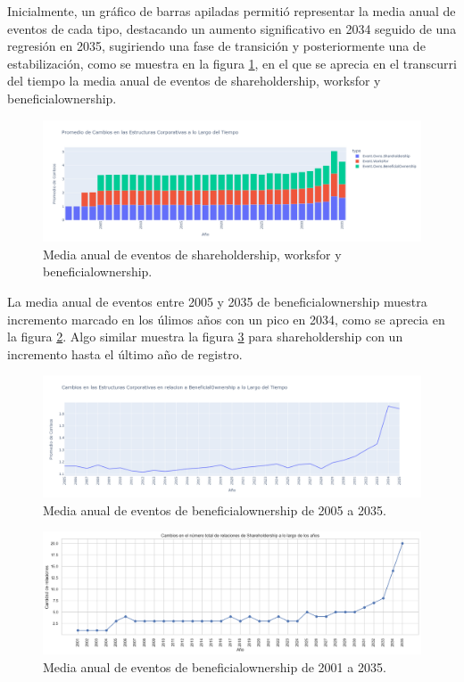 \documentclass[11pt,spanish,a4paper]{article}
\begin{document}
Inicialmente, un gráfico de barras apiladas permitió representar la media anual de eventos de cada tipo, destacando un aumento significativo en 2034 seguido de una regresión en 2035, sugiriendo una fase de transición y posteriormente una de estabilización, como se muestra en la figura \ref{fig:medias_eventos}, en el que se aprecia en el transcurri del tiempo la media anual de eventos  de shareholdership, worksfor y beneficialownership.

\begin{figure}[H]
  \centering
  \includegraphics[width=0.7\linewidth]{graphs/promedio_cambio_estructuras.png}
  \caption{Media anual de eventos de shareholdership, worksfor y beneficialownership.}
  \label{fig:medias_eventos}
\end{figure}

La media anual de eventos entre 2005 y 2035 de beneficialownership muestra incremento marcado en los úlimos años con un pico en 2034, como se aprecia en la figura \ref{fig:beneficial_ownership_2005_2035}.
Algo similar muestra la figura \ref{fig:sharedholdership_top_anio} para shareholdership con un incremento hasta el último año de registro.

\begin{figure}[H]
  \centering
  \includegraphics[width=0.7\linewidth]{graphs/promedio_cambio_beneficialOwnership.png}
  \caption{Media anual de eventos de beneficialownership de 2005 a 2035.}
  \label{fig:beneficial_ownership_2005_2035}
\end{figure}

\begin{figure}[H]
  \centering
  \includegraphics[width=0.7\linewidth]{graphs/dispersion_sharedholdership_top_anio_v2.png}
  \caption{Media anual de eventos de beneficialownership de 2001 a 2035.}
  \label{fig:sharedholdership_top_anio}
\end{figure}
\end{document}
